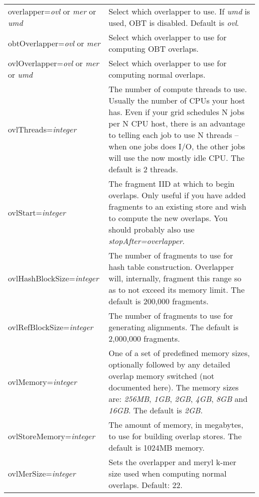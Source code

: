 \documentclass[twoside,11pt]{article}
\begin{document}
\begin{longtable}{lp{3.0in}}
overlapper={\em ovl} or {\em mer} or {\em umd} &
Select which overlapper to use.
If {\em umd} is used, OBT is disabled.
Default is {\em ovl}.
\\

obtOverlapper={\em ovl} or {\em mer} &
Select which overlapper to use for computing OBT overlaps.
\\

ovlOverlapper={\em ovl} or {\em mer} or {\em umd} &
Select which overlapper to use for computing normal overlaps.
\\

ovlThreads={\it integer} &
The number of compute threads to use.  Usually the number of CPUs your
host has.  Even if your grid schedules N jobs per N CPU host, there is
an advantage to telling each job to use N threads -- when one jobs
does I/O, the other jobs will use the now mostly idle CPU.  The default is 2 threads.
\\

ovlStart={\it integer} &
The fragment IID at which to begin overlaps.  Only useful if you have
added fragments to an existing store and wish to compute the new
overlaps.  You should probably also use {\it stopAfter=overlapper}.
\\

ovlHashBlockSize={\it integer} &
The number of fragments to use for hash table construction.
Overlapper will, internally, fragment this range so as to not exceed
its memory limit.  The default is 200,000 fragments.
\\

ovlRefBlockSize={\it integer} &
The number of fragments to use for generating alignments.  The default
is 2,000,000 fragments.
\\

ovlMemory={\it integer} &
One of a set of predefined memory sizes, optionally followed by any
detailed overlap memory switched (not documented here).  The memory sizes are:
{\it 256MB}, {\it 1GB}, {\it 2GB}, {\it 4GB}, {\it 8GB} and {\it 16GB}.
The default is {\it 2GB}.
\\

ovlStoreMemory={\it integer} &
The amount of memory, in megabytes, to use for building overlap
stores.  The default is 1024MB memory.
\\


ovlMerSize={\it integer} &
Sets the overlapper and meryl k-mer size used when computing normal
overlaps.  Default: 22.
\\


\end{longtable}
\end{document}

